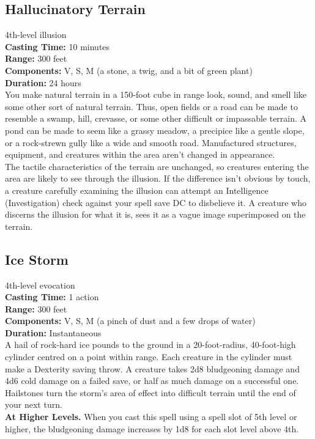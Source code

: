 \documentclass[11pt, A4paper, english]{article}
\begin{document}
		\subsection{Hallucinatory Terrain}
4th-level illusion \\
\textbf{Casting Time:} 10 minutes \\
\textbf{Range:} 300 feet \\
\textbf{Components:} V, S, M (a stone, a twig, and a bit of green plant) \\
\textbf{Duration:} 24 hours \\
You make natural terrain in a 150-foot cube in range look, sound, and smell like some other sort of natural terrain. Thus, open fields or a road can be made to resemble a swamp, hill, crevasse, or some other difficult or impassable terrain. A pond can be made to seem like a grassy meadow, a precipice like a gentle slope, or a rock-strewn gully like a wide and smooth road. Manufactured structures, equipment, and creatures within the area aren’t changed in appearance. \\
The tactile characteristics of the terrain are unchanged, so creatures entering the area are likely to see through the illusion. If the difference isn’t obvious by touch, a creature carefully examining the illusion can attempt an Intelligence (Investigation) check against your spell save DC to disbelieve it. A creature who discerns the illusion for what it is, sees it as a vague image superimposed on the terrain.

		\subsection{Ice Storm}
4th-level evocation \\
\textbf{Casting Time:} 1 action \\
\textbf{Range:} 300 feet \\
\textbf{Components:} V, S, M (a pinch of dust and a few drops of water) \\
\textbf{Duration:} Instantaneous \\
A hail of rock-hard ice pounds to the ground in a 20-foot-radius, 40-foot-high cylinder centred on a point within range. Each creature in the cylinder must make a Dexterity saving throw. A creature takes 2d8 bludgeoning damage and 4d6 cold damage on a failed save, or half as much damage on a successful one. \\
Hailstones turn the storm's area of effect into difficult terrain until the end of your next turn. \\
\textbf{At Higher Levels.} When you cast this spell using a spell slot of 5th level or higher, the bludgeoning damage increases by 1d8 for each slot level above 4th.
\end{document}
